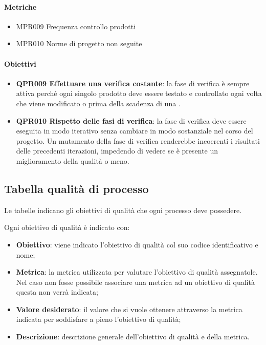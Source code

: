 		\paragraph*{Metriche}
		
		\begin{itemize}
			\item MPR009 Frequenza controllo prodotti
			\item MPR010 Norme di progetto non seguite
		\end{itemize}
		
		\paragraph*{Obiettivi}
		
		\begin{itemize}
			\item \textbf{QPR009 Effettuare una verifica costante}: la fase di verifica è sempre attiva perché ogni singolo prodotto deve essere testato e controllato ogni volta che viene modificato o prima della scadenza di una .
			\item \textbf{QPR010 Rispetto delle fasi di verifica}: la fase di verifica deve essere eseguita in modo iterativo senza cambiare in modo sostanziale nel corso del progetto. Un mutamento della fase di verifica renderebbe incoerenti i risultati delle precedenti iterazioni, impedendo di vedere se è presente un miglioramento della qualità o meno.
		\end{itemize}

\newpage
\subsection{Tabella qualità di processo}
Le tabelle indicano gli obiettivi di qualità che ogni processo deve possedere.

Ogni obiettivo di qualità è indicato con:

\begin{itemize}
	\item \textbf{Obiettivo}: viene indicato l'obiettivo di qualità col suo codice identificativo e nome;
	\item \textbf{Metrica}: la metrica utilizzata per valutare l'obiettivo di qualità assegnatole. Nel caso non fosse possibile associare una metrica ad un obiettivo di qualità questa non verrà indicata;
	\item \textbf{Valore desiderato}: il valore che si vuole ottenere attraverso la metrica indicata per soddisfare a pieno l'obiettivo di qualità;
	\item \textbf{Descrizione}: descrizione generale dell'obiettivo di qualità e della metrica.
\end{itemize}

